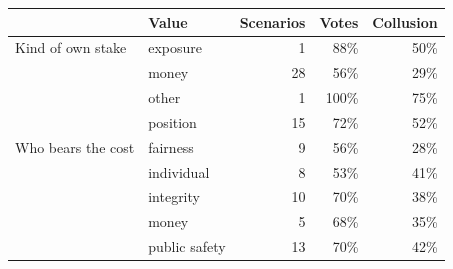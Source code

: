 \begin{tabular}{@{}llrrr@{}}
\toprule
 & Value & Scenarios & Votes & Collusion \\
\midrule
Kind of own stake & exposure & 1 & 88\% & 50\% \\
 & money & 28 & 56\% & 29\% \\
 & other & 1 & 100\% & 75\% \\
 & position & 15 & 72\% & 52\% \\
\addlinespace
Who bears the cost & fairness & 9 & 56\% & 28\% \\
 & individual & 8 & 53\% & 41\% \\
 & integrity & 10 & 70\% & 38\% \\
 & money & 5 & 68\% & 35\% \\
 & public safety & 13 & 70\% & 42\% \\
\bottomrule
\end{tabular}

